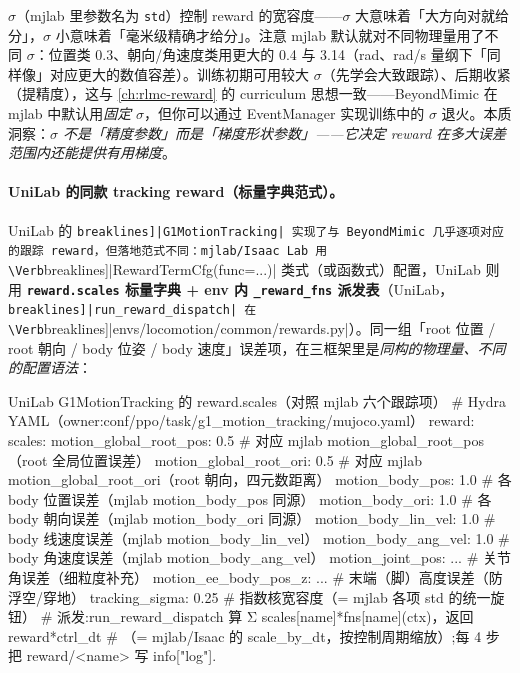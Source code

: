 \begin{insight}\label{ins:rlmc-imit-sigma}
$\sigma$（mjlab 里参数名为 \texttt{std}）控制 reward 的宽容度——$\sigma$ 大意味着「大方向对就给分」，$\sigma$ 小意味着「毫米级精确才给分」。注意 mjlab 默认就对不同物理量用了不同 $\sigma$：位置类 0.3、朝向/角速度类用更大的 0.4 与 3.14（rad、rad/s 量纲下「同样像」对应更大的数值容差）。训练初期可用较大 $\sigma$（先学会大致跟踪）、后期收紧（提精度），这与 \cref{ch:rlmc-reward} 的 curriculum 思想一致——BeyondMimic 在 mjlab 中默认用\emph{固定} $\sigma$，但你可以通过 EventManager 实现训练中的 $\sigma$ 退火。本质洞察：\emph{$\sigma$ 不是「精度参数」而是「梯度形状参数」——它决定 reward 在多大误差范围内还能提供有用梯度}。
\end{insight}

\paragraph{UniLab 的同款 tracking reward（标量字典范式）。}UniLab 的 \Verb[breaklines]|G1MotionTracking| 实现了与 BeyondMimic 几乎逐项对应的跟踪 reward，但落地范式不同：mjlab/Isaac Lab 用 \Verb[breaklines]|RewardTermCfg(func=...)| 类式（或函数式）配置，UniLab 则用 \textbf{\texttt{reward.\allowbreak scales} 标量字典 + env 内 \texttt{\_reward\_fns} 派发表}（UniLab，\Verb[breaklines]|run_reward_dispatch| 在 \Verb[breaklines]|envs/locomotion/common/rewards.py|）。同一组「root 位置 / root 朝向 / body 位姿 / body 速度」误差项，在三框架里是\emph{同构的物理量、不同的配置语法}：

\begin{codebox}[Python]{UniLab G1MotionTracking 的 reward.scales（对照 mjlab 六个跟踪项）}
# Hydra YAML（owner:conf/ppo/task/g1_motion_tracking/mujoco.yaml）
reward:
  scales:
    motion_global_root_pos: 0.5    # 对应 mjlab motion_global_root_pos（root 全局位置误差）
    motion_global_root_ori: 0.5    # 对应 mjlab motion_global_root_ori（root 朝向，四元数距离）
    motion_body_pos:        1.0    # 各 body 位置误差（mjlab motion_body_pos 同源）
    motion_body_ori:        1.0    # 各 body 朝向误差（mjlab motion_body_ori 同源）
    motion_body_lin_vel:    1.0    # body 线速度误差（mjlab motion_body_lin_vel）
    motion_body_ang_vel:    1.0    # body 角速度误差（mjlab motion_body_ang_vel）
    motion_joint_pos:       ...    # 关节角误差（细粒度补充）
    motion_ee_body_pos_z:   ...    # 末端（脚）高度误差（防浮空/穿地）
  tracking_sigma: 0.25             # 指数核宽容度（= mjlab 各项 std 的统一旋钮）
# 派发:run_reward_dispatch 算 Σ scales[name]*fns[name](ctx)，返回 reward*ctrl_dt
#   （= mjlab/Isaac 的 scale_by_dt，按控制周期缩放）;每 4 步把 reward/<name> 写 info["log"].
\end{codebox}

